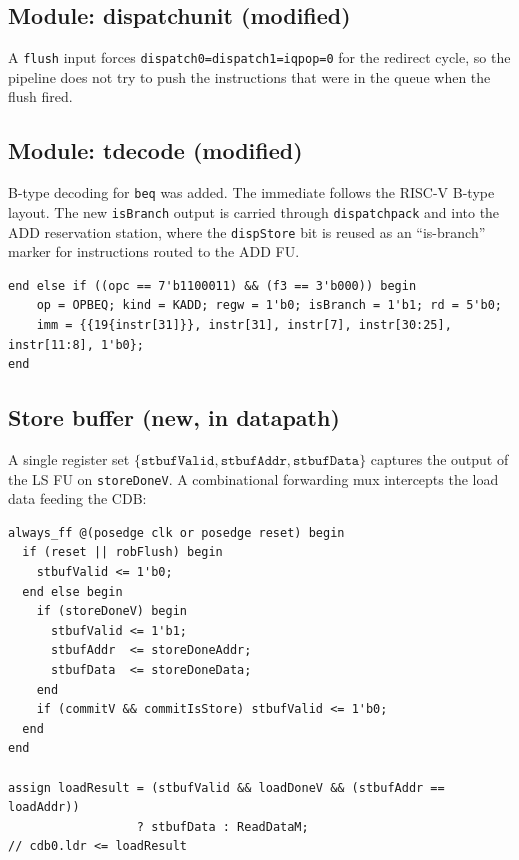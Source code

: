 \documentclass[11pt]{article}
\begin{document}
\subsection{Module: dispatchunit (modified)}

A \texttt{flush} input forces \texttt{dispatch0=dispatch1=iqpop=0} for the
redirect cycle, so the pipeline does not try to push the instructions that
were in the queue when the flush fired.

\subsection{Module: tdecode (modified)}

B-type decoding for \texttt{beq} was added. The immediate follows the RISC-V
B-type layout. The new \texttt{isBranch} output is carried through
\texttt{dispatchpack} and into the ADD reservation station, where the
\texttt{dispStore} bit is reused as an ``is-branch'' marker for instructions
routed to the ADD FU.

\begin{lstlisting}[style=verilog, caption=BEQ decode]
end else if ((opc == 7'b1100011) && (f3 == 3'b000)) begin
    op = OPBEQ; kind = KADD; regw = 1'b0; isBranch = 1'b1; rd = 5'b0;
    imm = {{19{instr[31]}}, instr[31], instr[7], instr[30:25], instr[11:8], 1'b0};
end
\end{lstlisting}

\subsection{Store buffer (new, in datapath)}

A single register set $\{\texttt{stbufValid}, \texttt{stbufAddr},
  \texttt{stbufData}\}$ captures the output of the LS FU on
\texttt{storeDoneV}. A combinational forwarding mux intercepts the load
data feeding the CDB:

\begin{lstlisting}[style=verilog, caption=Store-buffer update and forwarding]
always_ff @(posedge clk or posedge reset) begin
  if (reset || robFlush) begin
    stbufValid <= 1'b0;
  end else begin
    if (storeDoneV) begin
      stbufValid <= 1'b1;
      stbufAddr  <= storeDoneAddr;
      stbufData  <= storeDoneData;
    end
    if (commitV && commitIsStore) stbufValid <= 1'b0;
  end
end

assign loadResult = (stbufValid && loadDoneV && (stbufAddr == loadAddr))
                  ? stbufData : ReadDataM;
// cdb0.ldr <= loadResult
\end{lstlisting}
\end{document}
